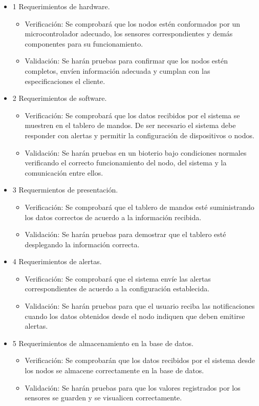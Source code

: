 \documentclass[
11pt, %
]{charter}
\begin{document}
\begin{itemize} 
\item 1 Requerimientos de hardware.
\begin{itemize}
	\item Verificación: Se comprobará que los nodos estén conformados por un microcontrolador adecuado, los sensores correspondientes y demás componentes para su funcionamiento.
	\item Validación: Se harán pruebas para confirmar que los nodos estén completos, envíen información adecuada y cumplan con las especificaciones el cliente.
\end{itemize}

\item 2 Requerimientos de software.
\begin{itemize}
	\item Verificación: Se comprobará que los datos recibidos por el sistema se muestren en el tablero de mandos. De ser necesario el sistema debe responder con alertas y permitir la configuración de dispositivos o nodos.
	\item Validación: Se harán pruebas en un bioterio bajo condiciones normales verificando el correcto funcionamiento del nodo, del sistema y la comunicación entre ellos.
\end{itemize}

\item 3 Requermientos de presentación.
\begin{itemize}
	\item Verificación: Se comprobará que el tablero de mandos esté suministrando los datos correctos de acuerdo a la información recibida.
	\item Validación: Se harán pruebas para demostrar que el tablero esté desplegando la información correcta.
\end{itemize}

\item 4 Requerimientos de alertas.
\begin{itemize}
	\item Verificación: Se comprobará que el sistema envíe las alertas correspondientes de acuerdo a la configuración establecida.
	\item Validación: Se harán pruebas para que el usuario reciba las notificaciones cuando los datos obtenidos desde el nodo indiquen que deben emitirse alertas.
\end{itemize}

\item 5 Requerimientos de almacenamiento en la base de datos.
\begin{itemize}
	\item Verificación: Se comprobarán que los datos recibidos por el sistema desde los nodos se almacene correctamente en la base de datos.
	\item Validación: Se harán pruebas para que los valores registrados por los sensores se guarden y se visualicen correctamente.
\end{itemize}

\end{itemize}
\end{document}
